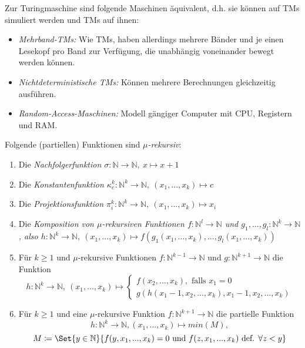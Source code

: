 \documentclass{cheat-sheet}
\begin{document}

\begin{bem}
Zur Turingmaschine sind folgende Maschinen äquivalent, d.h. sie können auf TMs simuliert werden und TMs auf ihnen:
  \begin{itemize}
    \item \emph{Mehrband-TMs:} Wie TMs, haben allerdings mehrere Bänder und je einen Lesekopf pro Band zur Verfügung, die unabhängig voneinander bewegt werden können.
    \item \emph{Nichtdeterministische TMs:} Können mehrere Berechnungen gleichzeitig ausführen.
    \item \emph{Random-Access-Maschinen:} Modell gängiger Computer mit CPU, Registern und RAM.
  \end{itemize}
\end{bem}

\begin{defn}
  Folgende (partiellen) Funktionen sind \emph{$\mu$-rekursiv}:
  \begin{enumerate}
    \item Die \it{Nachfolgerfunktion} $\sigma : \mathbb{N} \to \mathbb{N},\ x \mapsto x + 1$
    \item Die \it{Konstantenfunktion} $\kappa_{c}^{k} : \mathbb{N}^{k} \to \mathbb{N},\ (x_{1}, ..., x_{k}) \mapsto c$
    \item Die \it{Projektionsfunktion} $\pi_{i}^{k} : \mathbb{N}^{k} \to \mathbb{N},\ (x_{1}, ..., x_{k}) \mapsto x_{i}$
    \item Die \it{Komposition} von $\mu$-rekursiven Funktionen $f : \mathbb{N}^{l} \to \mathbb{N}$ und $g_{1}, ..., g_{l} : \mathbb{N}^{k} \to \mathbb{N}$, also $h : \mathbb{N}^{k} \to \mathbb{N},\ (x_{1}, ..., x_{k}) \mapsto f(g_{1}(x_{1}, ..., x_{k}), ..., g_{l}(x_{1}, ..., x_{k}))$
    \item Für $k \ge 1$ und $\mu$-rekursive Funktionen $f : \mathbb{N}^{k-1} \to \mathbb{N}$ und $g : \mathbb{N}^{k + 1} \to \mathbb{N}$ die Funktion
      { \scriptsize
      \[ h : \mathbb{N}^{k} \to \mathbb{N},\ (x_{1}, ..., x_{k}) \mapsto \begin{cases} f(x_{2}, ..., x_{k}), \text{ falls } x_{1} = 0 \\ g(h(x_{1} - 1, x_{2}, ..., x_{k}), x_{1} - 1, x_{2}, ..., x_{k}) \end{cases} \]
      }
    \item Für $k \ge 1$ und eine $\mu$-rekursive Funktion $f : \mathbb{N}^{k + 1} \to \mathbb{N}$ die partielle Funktion
      { \scriptsize
      \[ h : \mathbb{N}^{k} \to \mathbb{N}, (x_{1}, ..., x_{k}) \mapsto min(M), \]
      \[ M \coloneqq \Set{ y \in \mathbb{N} }{ f(y, x_1, ..., x_k) = 0 \text{ und } f(z, x_1, ..., x_k) \text{ def. } \forall z < y } \]
      }
  \end{enumerate}
\end{defn}
\end{document}
